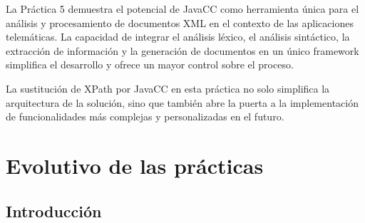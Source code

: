 \noindent La Práctica 5 demuestra el potencial de JavaCC como herramienta única para el análisis y procesamiento de documentos XML en el contexto de las aplicaciones telemáticas. La capacidad de integrar el análisis léxico, el análisis sintáctico, la extracción de información y la generación de documentos en un único framework simplifica el desarrollo y ofrece un mayor control sobre el proceso. 



La sustitución de XPath por JavaCC en esta práctica no solo simplifica la arquitectura de la solución, sino que también abre la puerta a la implementación de funcionalidades más complejas y personalizadas en el futuro.

\section{Evolutivo de las prácticas}

\subsection{Introducción}




